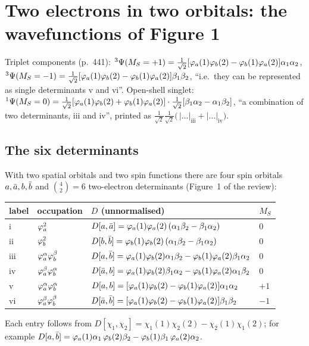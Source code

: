 \section{Two electrons in two orbitals: the wavefunctions of Figure 1}\label{sec:twoe}

\begin{reviewclaim}
Triplet components (p.~441):
$^3\Psi(M_S=+1)=\tfrac1{\sqrt2}[\varphi_a(1)\varphi_b(2)-\varphi_b(1)\varphi_a(2)]\alpha_1\alpha_2$,
$^3\Psi(M_S=-1)=\tfrac1{\sqrt2}[\varphi_a(1)\varphi_b(2)-\varphi_b(1)\varphi_a(2)]\beta_1\beta_2$, ``i.e.\ they can be
represented as single determinants v and vi''. Open-shell singlet:
$^1\Psi(M_S=0)=\tfrac1{\sqrt2}[\varphi_a(1)\varphi_b(2)+\varphi_b(1)\varphi_a(2)]\cdot\tfrac1{\sqrt2}[\beta_1\alpha_2-\alpha_1\beta_2]$,
``a combination of two determinants, iii and iv'', printed as
$\tfrac1{\sqrt2}\tfrac1{\sqrt2}\bigl(\,|\dots|_{\text{iii}}+|\dots|_{\text{iv}}\bigr)$.
\end{reviewclaim}

\subsection{The six determinants}
With two spatial orbitals and two spin functions there are four spin orbitals $a,\bar a,b,\bar b$ and
$\binom42=6$ two-electron determinants (Figure~1 of the review):
\begin{center}
\begin{tabular}{llll}
\toprule
label & occupation & $D$ (unnormalised) & $M_S$\\
\midrule
i   & $\varphi_a^2$ & $D[a,\bar a]=\varphi_a(1)\varphi_a(2)\,(\alpha_1\beta_2-\beta_1\alpha_2)$ & 0\\
ii  & $\varphi_b^2$ & $D[b,\bar b]=\varphi_b(1)\varphi_b(2)\,(\alpha_1\beta_2-\beta_1\alpha_2)$ & 0\\
iii & $\varphi_a^\alpha\varphi_b^\beta$ & $D[a,\bar b]=\varphi_a(1)\varphi_b(2)\alpha_1\beta_2-\varphi_b(1)\varphi_a(2)\beta_1\alpha_2$ & 0\\
iv  & $\varphi_a^\beta\varphi_b^\alpha$ & $D[\bar a,b]=\varphi_a(1)\varphi_b(2)\beta_1\alpha_2-\varphi_b(1)\varphi_a(2)\alpha_1\beta_2$ & 0\\
v   & $\varphi_a^\alpha\varphi_b^\alpha$ & $D[a,b]=[\varphi_a(1)\varphi_b(2)-\varphi_b(1)\varphi_a(2)]\alpha_1\alpha_2$ & $+1$\\
vi  & $\varphi_a^\beta\varphi_b^\beta$ & $D[\bar a,\bar b]=[\varphi_a(1)\varphi_b(2)-\varphi_b(1)\varphi_a(2)]\beta_1\beta_2$ & $-1$\\
\bottomrule
\end{tabular}
\end{center}
Each entry follows from $D[\chi_1,\chi_2]=\chi_1(1)\chi_2(2)-\chi_2(1)\chi_1(2)$; for example
$D[a,\bar b]=\varphi_a(1)\alpha_1\,\varphi_b(2)\beta_2-\varphi_b(1)\beta_1\,\varphi_a(2)\alpha_2$.

